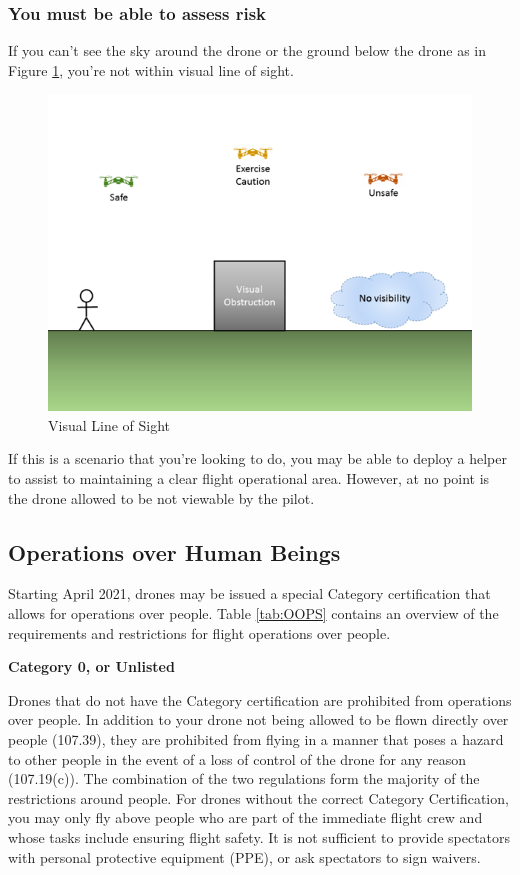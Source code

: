 \documentclass[
  12pt,
]{book}
\begin{document}
\subsubsection{You must be able to assess risk}\label{you-must-be-able-to-assess-risk}

If you can't see the sky around the drone or the ground below the drone as in Figure \ref{fig:vlos}, you're not within visual line of sight.

\begin{figure}

{\centering \includegraphics[width=0.8\linewidth]{images/VLOS_G} 

}

\caption{Visual Line of Sight}\label{fig:vlos}
\end{figure}

If this is a scenario that you're looking to do, you may be able to deploy a helper to assist to maintaining a clear flight operational area. However, at no point is the drone allowed to be not viewable by the pilot.

\subsection{Operations over Human Beings}\label{operations-over-human-beings}

Starting April 2021, drones may be issued a special Category certification that allows for operations over people. Table \ref{tab:OOPS} contains an overview of the requirements and restrictions for flight operations over people.

\textbf{Category 0, or Unlisted}

Drones that do not have the Category certification are prohibited from operations over people. In addition to your drone not being allowed to be flown directly over people (107.39), they are prohibited from flying in a manner that poses a hazard to other people in the event of a loss of control of the drone for any reason (107.19(c)). The combination of the two regulations form the majority of the restrictions around people. For drones without the correct Category Certification, you may only fly above people who are part of the immediate flight crew and whose tasks include ensuring flight safety. It is not sufficient to provide spectators with personal protective equipment (PPE), or ask spectators to sign waivers.
\end{document}

